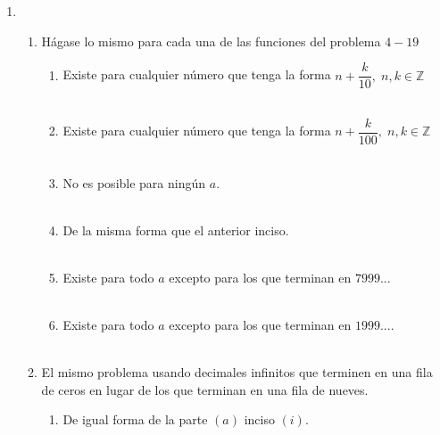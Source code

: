 \begin{enumerate}
\begin{enumerate}[\bfseries (i)]
\end{enumerate}

\item 
\begin{enumerate}[\bfseries (a)]
    
    \item Hágase lo mismo para cada una de las funciones del problema $4-19$
    \begin{enumerate}[\bfseries (i)]
	
	\item Existe para cualquier número que tenga la forma $n+\dfrac{k}{10}, \; n,k\in \mathbb{Z}$\\\\
	
	\item Existe para cualquier número que tenga la forma $n + \dfrac{k}{100},\; n,k \in \mathbb{Z}$\\\\
	
	\item No es posible para ningún $a$.\\\\
	
	\item De la misma forma que el anterior inciso.\\\\
	
	\item Existe para todo $a$ excepto para los que terminan en $7999...$\\\\
	
	\item Existe para todo $a$ excepto para los que terminan en $1999...$.\\\\

    \end{enumerate}

    \item El mismo problema usando decimales infinitos que terminen en una fila de ceros en lugar de los que terminan en una fila de nueves.
    \begin{enumerate}[\bfseries (i)]
	
	\item De igual forma de la parte $(a)$ inciso $(i)$.\\\\
	

\end{enumerate}
\end{enumerate}
\end{enumerate}

